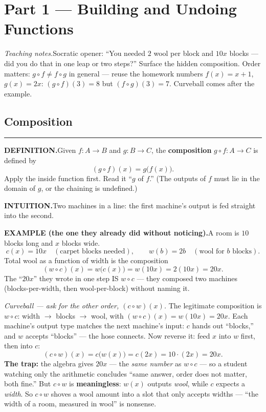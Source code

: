 \documentclass[12pt]{article}
\begin{document}
\bigskip

\section*{Part 1 --- Building and Undoing Functions} 

\textit{Teaching notes.}\quad Socratic opener: ``You needed $2$ wool per block and $10x$ blocks --- did you do that in one leap or two steps?'' Surface the hidden composition. Order matters: $g \circ f \ne f \circ g$ in general --- reuse the homework numbers $f(x)=x+1$, $g(x)=2x$: $(g\circ f)(3)=8$ but $(f\circ g)(3)=7$. Curveball comes after the example. 

\subsection*{Composition}
\hrule
\textbf{DEFINITION.}\quad Given $f\colon A \to B$ and $g\colon B \to C$, the \textbf{composition} $g \circ f \colon A \to C$ is defined by
\[
  (g \circ f)(x) = g\bigl(f(x)\bigr).
\]
Apply the inside function first. Read it ``$g$ of $f$.'' (The outputs of $f$ must lie in the domain of $g$, or the chaining is undefined.)

\textbf{INTUITION.}\quad Two machines in a line: the first machine's output is fed straight into the second.

\textbf{EXAMPLE (the one they already did without noticing).}\quad A room is $10$ blocks long and $x$ blocks wide.
\[
  c(x) = 10x \quad(\text{carpet blocks needed}), \qquad w(b) = 2b \quad(\text{wool for } b \text{ blocks}).
\]
Total wool as a function of width is the composition
\[
  (w \circ c)(x) = w\bigl(c(x)\bigr) = w(10x) = 2(10x) = 20x.
\]
The ``$20x$'' they wrote in one step IS $w \circ c$ --- they composed two machines (blocks-per-width, then wool-per-block) without naming it.

\textit{Curveball --- ask for the other order, $(c \circ w)(x)$.}\quad
The legitimate composition is $w \circ c$: width $\to$ blocks $\to$ wool, with $(w \circ c)(x) = w(10x) = 20x$. Each machine's output type matches the next machine's input: $c$ hands out ``blocks,'' and $w$ accepts ``blocks'' --- the hose connects. Now reverse it: feed $x$ into $w$ first, then into $c$:
\[
  (c \circ w)(x) = c\bigl(w(x)\bigr) = c(2x) = 10 \cdot (2x) = 20x.
\]
\textbf{The trap:} the algebra gives $20x$ --- the \emph{same number} as $w \circ c$ --- so a student watching only the arithmetic concludes ``same answer, order does not matter, both fine.'' But $c \circ w$ is \textbf{meaningless}: $w(x)$ outputs \emph{wool}, while $c$ expects a \emph{width}. So $c \circ w$ shoves a wool amount into a slot that only accepts widths --- ``the width of a room, measured in wool'' is nonsense.
\end{document}
